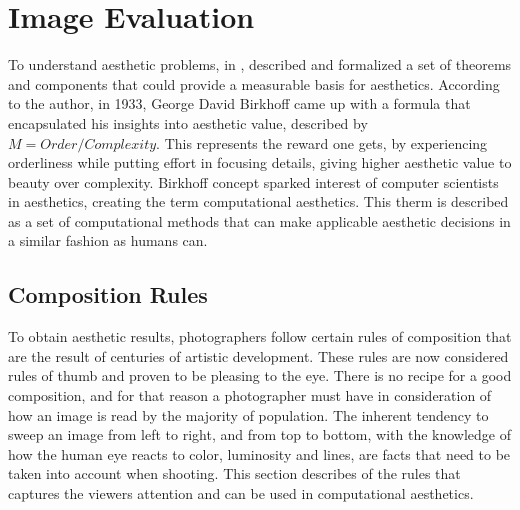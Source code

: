 \section{Image Evaluation}
\label{sec:foto_eval}
To understand aesthetic problems, \citeauthor{Hoenig2005} in \cite{Hoenig2005}, described and formalized a set of theorems and components that could provide a measurable basis for aesthetics.
According to the author, in 1933, George David Birkhoff came up with a formula that encapsulated his insights into aesthetic value, described by $ M = Order/Complexity $. This represents the reward one gets, by experiencing orderliness while putting effort in focusing details, giving higher aesthetic value to beauty over complexity. Birkhoff concept sparked interest of computer scientists in aesthetics, creating the term computational aesthetics. This therm is described as a set of computational methods that can make applicable aesthetic decisions in a similar fashion as humans can.


\subsection{Composition Rules}
\label{sub:foto_rules}

To obtain aesthetic results, photographers follow certain rules of composition that are the result of centuries of artistic development. These rules are now considered rules of thumb and proven to be pleasing to the eye.
There is no recipe for a good composition, and for that reason a photographer must have in consideration of how an image is read by the majority of population. The inherent tendency to sweep an image from left to right, and from top to bottom, with the knowledge of how the human eye reacts to color, luminosity and  lines, are facts that need to be taken into account when shooting. This section describes of the rules that captures the viewers attention and can be used in computational aesthetics.

